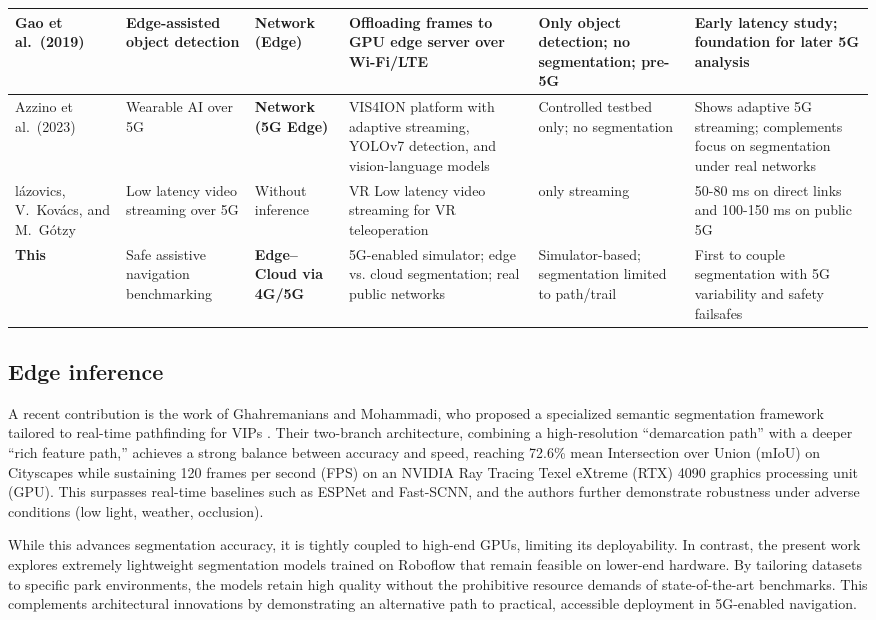 \documentclass{ieeeaccess}
\begin{document}
\begin{table}[t]
\begin{tabular}{|p{2.4cm}|p{2.4cm}|p{2.0cm}|p{3.2cm}|p{2.5cm}|p{3.0cm}|}
\cite{gao2019edge} Gao et al.\ (2019) & Edge-assisted object detection & \textbf{Network (Edge)} & Offloading frames to GPU edge server over Wi-Fi/LTE & Only object detection; no segmentation; pre-5G & Early latency study; foundation for later 5G analysis \\
\hline
\cite{azzino2023vis4ion} Azzino et al.\ (2023) & Wearable AI over 5G & \textbf{Network (5G Edge)} & VIS4ION platform with adaptive streaming, YOLOv7 detection, and vision-language models & Controlled testbed only; no segmentation & Shows adaptive 5G streaming; complements focus on segmentation under real networks \\
\hline
\cite{VRLeleop2024IEEE} l\'azovics, V.~Kov\'acs, and M.~G\'otzy & Low latency video streaming over 5G & Without inference &  VR Low latency video streaming for VR teleoperation & only streaming & 50-80 ms on direct links and 100-150 ms on public 5G \\
\hline
\textbf{This} & Safe assistive navigation benchmarking & \textbf{Edge–Cloud via 4G/5G} & 5G-enabled simulator; edge vs. cloud segmentation; real public networks & Simulator-based; segmentation limited to path/trail & First to couple segmentation with 5G variability and safety failsafes \\
\hline
\end{tabular}
\end{table}

\subsection{Edge inference}

A recent contribution is the work of Ghahremanians and Mohammadi, who proposed a specialized semantic segmentation framework tailored to real-time pathfinding for VIPs \cite{pathfinding2025}. Their two-branch architecture, combining a high-resolution “demarcation path” with a deeper “rich feature path,” achieves a strong balance between accuracy and speed, reaching 72.6\% mean Intersection over Union (mIoU) on Cityscapes while sustaining 120 frames per second (FPS) on an NVIDIA Ray Tracing Texel eXtreme (RTX) 4090 graphics processing unit (GPU). This surpasses real-time baselines such as ESPNet and Fast-SCNN, and the authors further demonstrate robustness under adverse conditions (low light, weather, occlusion).

While this advances segmentation accuracy, it is tightly coupled to high-end GPUs, limiting its deployability. In contrast, the present work explores extremely lightweight segmentation models trained on Roboflow that remain feasible on lower-end hardware. By tailoring datasets to specific park environments, the models retain high quality without the prohibitive resource demands of state-of-the-art benchmarks. This complements architectural innovations by demonstrating an alternative path to practical, accessible deployment in 5G-enabled navigation.
\end{document}
